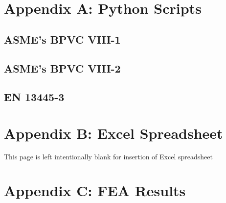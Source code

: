\renewcommand{\thesection}{A.\arabic{section}}
\chapter{Appendix A: Python Scripts}
\label{appendix:a}
\nopagebreak
\begin{small}

	\section{ASME's BPVC VIII-1}
	\label{appendix:a1}
	
	\pagebreak
	
	\section{ASME's BPVC VIII-2}
	\label{appendix:a2}
	
	\pagebreak
	
	\section{EN 13445-3}
	\label{appendix:a3}
	

\end{small}

\renewcommand{\thesection}{B.\arabic{section}}
\chapter{Appendix B: Excel Spreadsheet}
\label{appendix:b}

\vfill
\begin{center}
This page is left intentionally blank for insertion of Excel spreadsheet
\end{center}
\vfill



\renewcommand{\thesection}{C.\arabic{section}}
\chapter{Appendix C: FEA Results}
\label{appendix:c}